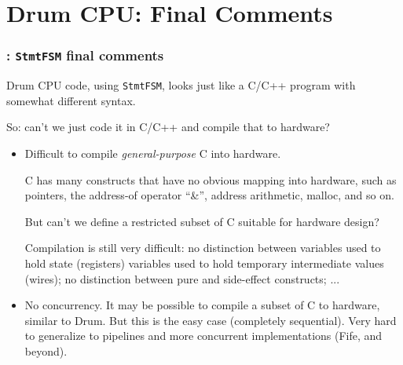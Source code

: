 \section{Drum CPU: Final Comments}

\begin{frame}[fragile]
\frametitle{{\BSV}: {\tt StmtFSM} final comments}

\footnotesize

Drum CPU code, using {\tt StmtFSM}, looks just like a C/C++ program
with somewhat different syntax.

\vspace{2ex}

So: can't we just code it in C/C++ and compile that to hardware?

\vspace{2ex}

\begin{itemize}
        
 \item Difficult to compile \emph{general-purpose} C into hardware.

       C has many constructs that have no obvious mapping into
       hardware, such as pointers, the address-of operator ``\&'',
       address arithmetic, malloc, and so on.

       But can’t we define a restricted subset of C suitable for
       hardware design?

       Compilation is still very difficult: no distinction between
       variables used to hold state (registers) {\vs} variables used
       to hold temporary intermediate values (wires); no distinction
       between pure and side-effect constructs; ...

 \item No concurrency.  It may be possible to compile a subset of C to
       hardware, similar to Drum.  But this is the easy case
       (completely sequential).  Very hard to generalize to pipelines
       and more concurrent implementations (Fife, and beyond).

\end{itemize}

\end{frame}






